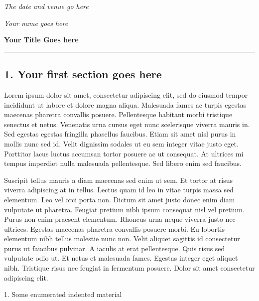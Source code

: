 \documentclass[10pt,oneside,a4paper]{article}
\date{ }
\begin{document}
\textit{The date and venue go here}

\begin{flushright}
\vspace{-1.27cm}
\textit{Your name goes here
}
\end{flushright}


\begin{center}
\Large{\textbf{Your Title Goes here}}\\
\rule{18.4cm}{0.5pt}
\end{center}



\begin{multicols}{2}


\subsection*{1. Your first section goes here}

Lorem ipsum dolor sit amet, consectetur adipiscing elit, sed do eiusmod tempor incididunt ut labore et dolore magna aliqua. Malesuada fames ac turpis egestas maecenas pharetra convallis posuere. Pellentesque habitant morbi tristique senectus et netus. Venenatis urna cursus eget nunc scelerisque viverra mauris in. Sed egestas egestas fringilla phasellus faucibus. Etiam sit amet nisl purus in mollis nunc sed id. Velit dignissim sodales ut eu sem integer vitae justo eget. Porttitor lacus luctus accumsan tortor posuere ac ut consequat. At ultrices mi tempus imperdiet nulla malesuada pellentesque. Sed libero enim sed faucibus.

Suscipit tellus mauris a diam maecenas sed enim ut sem. Et tortor at risus viverra adipiscing at in tellus. Lectus quam id leo in vitae turpis massa sed elementum. Leo vel orci porta non. Dictum sit amet justo donec enim diam vulputate ut pharetra. Feugiat pretium nibh ipsum consequat nisl vel pretium. Purus non enim praesent elementum. Rhoncus urna neque viverra justo nec ultrices. Egestas maecenas pharetra convallis posuere morbi. Eu lobortis elementum nibh tellus molestie nunc non. Velit aliquet sagittis id consectetur purus ut faucibus pulvinar. A iaculis at erat pellentesque. Quis risus sed vulputate odio ut. Et netus et malesuada fames. Egestas integer eget aliquet nibh. Tristique risus nec feugiat in fermentum posuere. Dolor sit amet consectetur adipiscing elit.



\begin{description}
\item 1. Some enumerated indented material


\end{description}
\end{multicols}
\end{document}
